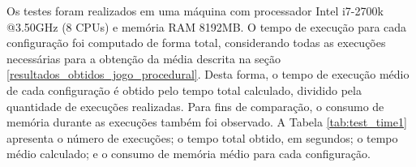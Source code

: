 Os testes foram realizados em uma máquina com processador Intel i7-2700k @3.50GHz (8 CPUs) e memória RAM 8192MB. O tempo de execução para cada configuração foi computado de forma total, considerando todas as execuções necessárias para a obtenção da média descrita na seção \ref{resultados_obtidos_jogo_procedural}. Desta forma, o tempo de execução médio de cada configuração é obtido pelo tempo total calculado, dividido pela quantidade de execuções realizadas. Para fins de comparação, o consumo de memória durante as execuções também foi observado. A Tabela \ref{tab:test_time1} apresenta o número de execuções; o tempo total obtido, em segundos; o tempo médio calculado; e o consumo de memória médio para cada configuração.

\begin{table}[htb]
\centering
\caption{Tempos e consumo de memória em cada execução obtido pelas configurações.}
\label{tab:test_time1}
\end{table}

